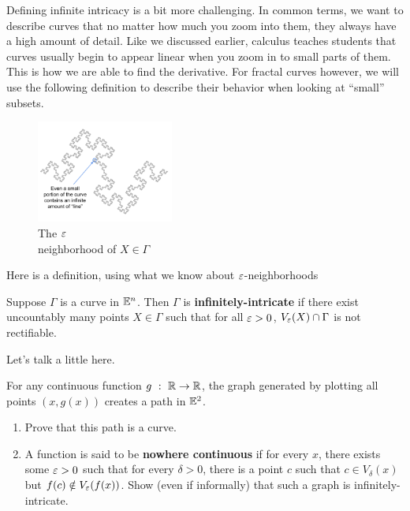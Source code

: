Defining infinite intricacy is a bit more challenging. In common terms, we want to describe curves that no matter how much you zoom into them, they always have a high amount of detail. Like we discussed earlier, calculus teaches students that curves usually begin to appear linear when you zoom in to small parts of them. This is how we are able to find the derivative. For fractal curves however, we will use the following definition to describe their behavior when looking at ``small'' subsets.\\ 

\begin{figure}
  \begin{center}
    \includegraphics[width=0.4\textwidth]{Images/1.1.3.png}
  \end{center}
  \caption{The $\varepsilon$ \\neighborhood of $X\in\Gamma$}
\end{figure}

Here is a definition, using what we know about $\varepsilon$-neighborhoods\\

\begin{definition}
    Suppose $\Gamma$ is a curve in $\mathbb{E}^n$. Then $\Gamma$ is \textbf{infinitely-intricate} if there exist uncountably many points  $X\in\Gamma$ such that for all $\varepsilon>0$, $V_\varepsilon(X)\cap \Gamma$ is not rectifiable.
\end{definition}

\clearpage



Let's talk a little here.\\

\begin{exercise}
    For any continuous function $g\ :\ \R\to\R$, the graph generated by plotting all points $(x,g(x))$ creates a path in $\mathbb{E}^2$. 
    \begin{enumerate}
        \item Prove that this path is a curve.
        \item A function is said to be \textbf{nowhere continuous} if for every $x$, there exists some $\varepsilon>0$ such that for every $\delta>0$, there is a point $c$ such that $c\in V_\delta(x)$ but $ f(c)\notin V_\varepsilon(f(x))$. Show (even if informally) that such a graph is infinitely-intricate.
    \end{enumerate}
\end{exercise}



